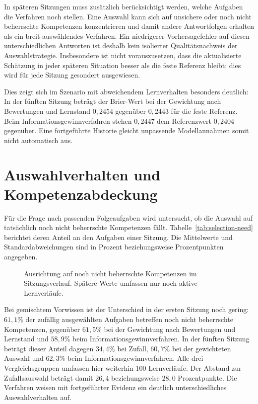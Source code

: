 In späteren Sitzungen muss zusätzlich berücksichtigt werden, welche
Aufgaben die Verfahren noch stellen. Eine Auswahl kann sich auf
unsichere oder noch nicht beherrschte Kompetenzen konzentrieren und
damit andere Antwortfolgen erhalten als ein breit auswählendes
Verfahren. Ein niedrigerer Vorhersagefehler auf diesen unterschiedlichen
Antworten ist deshalb kein isolierter Qualitätsnachweis der
Auswahlstrategie. Insbesondere ist nicht vorauszusetzen, dass die
aktualisierte Schätzung in jeder späteren Situation besser als die feste
Referenz bleibt; dies wird für jede Sitzung gesondert ausgewiesen.

Dies zeigt sich im Szenario mit abweichendem Lernverhalten besonders
deutlich: In der fünften Sitzung beträgt der Brier-Wert bei der
Gewichtung nach Bewertungen und Lernstand $0{,}2454$ gegenüber $0{,}2443$
für die feste Referenz. Beim Informationsgewinnverfahren stehen
$0{,}2447$ dem Referenzwert $0{,}2404$ gegenüber. Eine fortgeführte
Historie gleicht unpassende Modellannahmen somit nicht automatisch aus.

\section{Auswahlverhalten und Kompetenzabdeckung}
\label{sec:evaluation-auswahl}

Für die Frage nach passenden Folgeaufgaben wird untersucht, ob die
Auswahl auf tatsächlich noch nicht beherrschte Kompetenzen fällt.
Tabelle~\ref{tab:selection-need} berichtet deren Anteil an den Aufgaben
einer Sitzung. Die Mittelwerte und Standardabweichungen sind in Prozent
beziehungsweise Prozentpunkten angegeben.

\begin{table}[htbp]
  \centering
  \resizebox{\textwidth}{!}{\EvaluationNeedTable}
  \caption{Anteil der Aufgaben mit noch nicht beherrschter Zielkompetenz
    zum Auswahlzeitpunkt. Ein größerer Wert zeigt häufigere Auswahl
    bestehenden simulierten Lernbedarfs, nicht unmittelbar mehr Lernen.}
  \label{tab:selection-need}
\end{table}

\begin{figure}[htbp]
  \centering
  \EvaluationNeedPlot
  \caption{Ausrichtung auf noch nicht beherrschte Kompetenzen im
    Sitzungsverlauf. Spätere Werte umfassen nur noch aktive Lernverläufe.}
  \label{fig:selection-need}
\end{figure}

Bei gemischtem Vorwissen ist der Unterschied in der ersten Sitzung
noch gering: $61{,}1\%$ der zufällig ausgewählten Aufgaben betreffen
noch nicht beherrschte Kompetenzen, gegenüber $61{,}5\%$ bei der
Gewichtung nach Bewertungen und Lernstand und $58{,}9\%$ beim
Informationsgewinnverfahren. In der fünften Sitzung beträgt dieser
Anteil dagegen $34{,}4\%$ bei Zufall, $60{,}7\%$ bei der gewichteten
Auswahl und $62{,}3\%$ beim Informationsgewinnverfahren. Alle drei
Vergleichsgruppen umfassen hier weiterhin 100 Lernverläufe.
Der Abstand zur Zufallsauswahl beträgt damit $26{,}4$ beziehungsweise
$28{,}0$ Prozentpunkte. Die Verfahren weisen mit fortgeführter Evidenz
ein deutlich unterschiedliches Auswahlverhalten auf.

